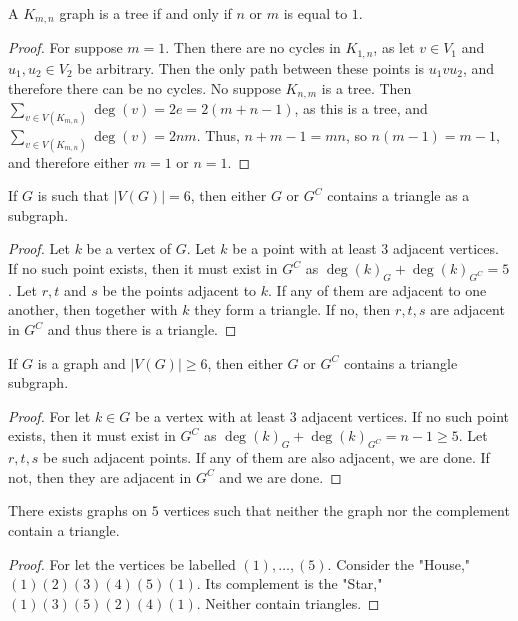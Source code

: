         \begin{theorem}
        A $K_{m,n}$ graph is a tree if and only if $n$ or $m$ is equal to $1$.
        \end{theorem}
        \begin{proof}
        For suppose $m=1$. Then there are no cycles in $K_{1,n}$, as let $v\in V_1$ and $u_1,u_2\in V_2$ be arbitrary. Then the only path between these points is $u_1 v u_2$, and therefore there can be no cycles. No suppose $K_{n,m}$ is a tree. Then $\sum_{v\in V(K_{m,n})}\deg(v) = 2e=2(m+n-1)$, as this is a tree, and $\sum_{v\in V(K_{m,n})}\deg(v) = 2nm$. Thus, $n+m-1=mn$, so $n(m-1)=m-1$, and therefore either $m=1$ or $n=1$.
        \end{proof}
        \begin{theorem}
        If $G$ is such that $|V(G)|=6$, then either $G$ or $G^C$ contains a triangle as a subgraph.
        \end{theorem}
        \begin{proof}
        Let $k$ be a vertex of $G$. Let $k$ be a point with at least $3$ adjacent vertices. If no such point exists, then it must exist in $G^C$ as $\deg(k)_G+\deg(k)_{G^C}=5$. Let $r,t$ and $s$ be the points adjacent to $k$. If any of them are adjacent to one another, then together with $k$ they form a triangle. If no, then $r,t,s$ are adjacent in $G^C$ and thus there is a triangle.
        \end{proof}
        \begin{theorem}
        If $G$ is a graph and $|V(G)|\geq 6$, then either $G$ or $G^C$ contains a triangle subgraph.
        \end{theorem}
        \begin{proof}
        For let $k\in G$ be a vertex with at least $3$ adjacent vertices. If no such point exists, then it must exist in $G^C$ as $\deg(k)_G+\deg(k)_{G^C} = n-1 \geq 5$. Let $r,t,s$ be such adjacent points. If any of them are also adjacent, we are done. If not, then they are adjacent in $G^C$ and we are done.
        \end{proof}
        \begin{theorem}
        There exists graphs on $5$ vertices such that neither the graph nor the complement contain a triangle.
        \end{theorem}
        \begin{proof}
        For let the vertices be labelled $(1),\hdots,(5)$. Consider the "House," $(1)(2)(3)(4)(5)(1)$. Its complement is the "Star," $(1)(3)(5)(2)(4)(1)$. Neither contain triangles.
        \end{proof}
